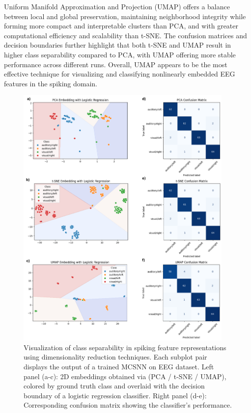 \noindent Uniform Manifold Approximation and Projection (UMAP) offers a balance between local and global preservation, maintaining neighborhood integrity while forming more compact and interpretable clusters than PCA, and with greater computational efficiency and scalability than t-SNE. The confusion matrices and decision boundaries further highlight that both t-SNE and UMAP result in higher class separability compared to PCA, with UMAP offering more stable performance across different runs. Overall, UMAP appears to be the most effective technique for visualizing and classifying nonlinearly embedded EEG features in the spiking domain.\\

\begin{figure}[htbp!]
    \centerline{\includegraphics[width=0.95\textwidth]{Chapter7/Figs/f.png}}
    \caption[Visualization of class separability in spiking feature representations using dimensionality reduction techniques.]{Visualization of class separability in spiking feature representations using dimensionality reduction techniques. Each subplot pair displays the output of a trained MCSNN on EEG dataset. Left panel (a-c): 2D embeddings obtained via (PCA / t-SNE / UMAP), colored by ground truth class and overlaid with the decision boundary of a logistic regression classifier.
    Right panel (d-e): Corresponding confusion matrix showing the classifier's performance.}
    \label{fig:7f}
\end{figure}

